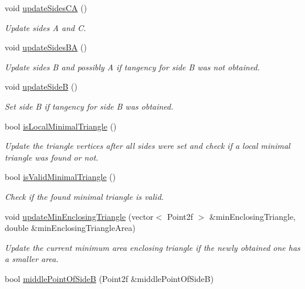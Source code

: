 \begin{DoxyCompactItemize}
void \hyperlink{classmultiscale_1_1MinEnclosingTriangleFinder_a0f4a9131f5118fa0afc33344bdf67f16}{update\-Sides\-C\-A} ()
\begin{DoxyCompactList}\small\item\em Update sides A and C. \end{DoxyCompactList}\item 
void \hyperlink{classmultiscale_1_1MinEnclosingTriangleFinder_a12f1835531784519d618b86e889af06d}{update\-Sides\-B\-A} ()
\begin{DoxyCompactList}\small\item\em Update sides B and possibly A if tangency for side B was not obtained. \end{DoxyCompactList}\item 
void \hyperlink{classmultiscale_1_1MinEnclosingTriangleFinder_ab25b3b5dbe05cb06e83a49cd28b3116f}{update\-Side\-B} ()
\begin{DoxyCompactList}\small\item\em Set side B if tangency for side B was obtained. \end{DoxyCompactList}\item 
bool \hyperlink{classmultiscale_1_1MinEnclosingTriangleFinder_a97747be924fe1d8efaf6cad9d635419b}{is\-Local\-Minimal\-Triangle} ()
\begin{DoxyCompactList}\small\item\em Update the triangle vertices after all sides were set and check if a local minimal triangle was found or not. \end{DoxyCompactList}\item 
bool \hyperlink{classmultiscale_1_1MinEnclosingTriangleFinder_a4f9c533c8d5de8b95c38b71f50a5e00c}{is\-Valid\-Minimal\-Triangle} ()
\begin{DoxyCompactList}\small\item\em Check if the found minimal triangle is valid. \end{DoxyCompactList}\item 
void \hyperlink{classmultiscale_1_1MinEnclosingTriangleFinder_a8608cacc403c71d7ac9bc017d7b14e0c}{update\-Min\-Enclosing\-Triangle} (vector$<$ Point2f $>$ \&min\-Enclosing\-Triangle, double \&min\-Enclosing\-Triangle\-Area)
\begin{DoxyCompactList}\small\item\em Update the current minimum area enclosing triangle if the newly obtained one has a smaller area. \end{DoxyCompactList}\item 
bool \hyperlink{classmultiscale_1_1MinEnclosingTriangleFinder_a664bee3e51e007b97fa21a92830f9066}{middle\-Point\-Of\-Side\-B} (Point2f \&middle\-Point\-Of\-Side\-B)

\end{DoxyCompactItemize}
